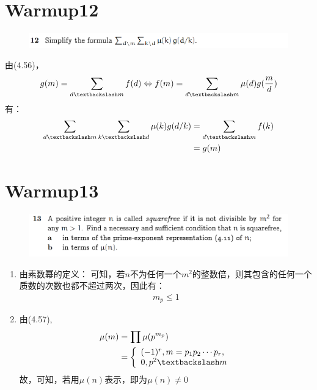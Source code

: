 \documentclass[]{article}
\begin{document}
\section*{Warmup12}
\begin{figure}[H]
    \includegraphics[scale = 0.6]{2023-03-23-10-20-01.png}
\end{figure}
由(4.56)，
\begin{equation}
    g(m) = \sum_{d \textbackslash m} f(d) \Leftrightarrow f(m) = \sum_{d \textbackslash m} \mu (d)g(\frac{m}{d}) \\
\end{equation}
有：
\begin{align}
    \sum_{d\textbackslash m}\sum_{k\textbackslash d} \mu (k)g(d/k) &= \sum_{d \textbackslash m}f(k)\\
    &= g(m)
\end{align}


\section*{Warmup13}
\begin{figure}[H]
    \includegraphics[scale = 0.6]{2023-03-23-10-20-20.png}
\end{figure}

\begin{enumerate}
    \item 由素数幂的定义：
    可知，若$n$不为任何一个$m^2$的整数倍，则其包含的任何一个质数的次数也都不超过两次，因此有：
    \begin{align}
        m_p \le 1
    \end{align}

    \item  由(4.57),
    \begin{align}
        \mu(m) &= \prod \mu (p ^{m_p})\\ 
        & = \left\{
        \begin{array}{l}
            (-1)^r,m=p_1p_2\cdots p_r,\\
            0, p^2 \textbackslash m
        \end{array}
        \right.
    \end{align}
    故，可知，若用$\mu(n)$表示，即为$\mu(n) \neq 0$
\end{enumerate}
\end{document}
